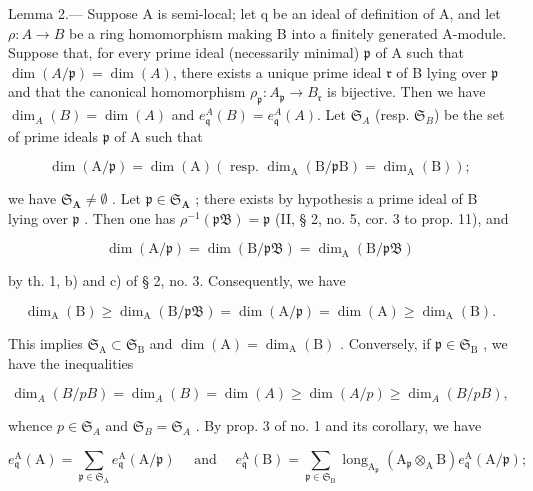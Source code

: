 Lemma 2.--- Suppose A is semi-local; let q be an ideal of definition of A, and let \(\rho : A \to B\) be a ring homomorphism making B into a finitely generated A-module. Suppose that, for every prime ideal (necessarily minimal) \(\mathfrak{p}\) of A such that \(\dim(A/\mathfrak{p}) = \dim(A)\), there exists a unique prime ideal \(\mathfrak{r}\) of B lying over \(\mathfrak{p}\) and that the canonical homomorphism \(\rho_{\mathfrak{p}} : A_{\mathfrak{p}} \to B_{\mathfrak{r}}\) is bijective. Then we have \(\dim_{A}(B) = \dim(A)\) and \(e_{\mathfrak{q}}^{A}(B) = e_{\mathfrak{q}}^{A}(A)\). Let \(\mathfrak{S}_{A}\) (resp. \(\mathfrak{S}_{B}\)) be the set of prime ideals \(\mathfrak{p}\) of A such that

\[
\dim (\mathrm{A} / \mathfrak {p}) = \dim (\mathrm{A}) (\text { resp. } \dim_ {\mathrm{A}} (\mathrm{B} / \mathfrak {p} \mathrm{B}) = \dim_ {\mathrm{A}} (\mathrm{B}));
\]

we have \(\mathfrak{S}_{\mathbf{A}} \neq \emptyset\) . Let \(\mathfrak{p} \in \mathfrak{S}_{\mathbf{A}}\) ; there exists by hypothesis a prime ideal of B lying over \(\mathfrak{p}\) . Then one has \(\rho^{-1}(\mathfrak{pB}) = \mathfrak{p}\) (II, § 2, no. 5, cor. 3 to prop. 11), and

\[
\dim (\mathrm{A} / \mathfrak {p}) = \dim (\mathrm{B} / \mathfrak {p B}) = \dim_ {\mathrm{A}} (\mathrm{B} / \mathfrak {p B})
\]

by th. 1, b) and c) of § 2, no. 3. Consequently, we have

\[
\dim_ {\mathrm{A}} (\mathrm{B}) \geqslant \dim_ {\mathrm{A}} (\mathrm{B} / \mathfrak {p B}) = \dim (\mathrm{A} / \mathfrak {p}) = \dim (\mathrm{A}) \geqslant \dim_ {\mathrm{A}} (\mathrm{B}).
\]

This implies \(\mathfrak{S}_{\mathrm{A}} \subset \mathfrak{S}_{\mathrm{B}}\) and \(\dim(\mathrm{A}) = \dim_{\mathrm{A}}(\mathrm{B})\) . Conversely, if \(\mathfrak{p} \in \mathfrak{S}_{\mathrm{B}}\) , we have the inequalities

\[
\dim_ {A} (B / p B) = \dim_ {A} (B) = \dim (A) \geqslant \dim (A / p) \geqslant \dim_ {A} (B / p B),
\]

whence \(p \in \mathfrak{S}_A\) and \(\mathfrak{S}_B = \mathfrak{S}_A\) . By prop. 3 of no. 1 and its corollary, we have

\[
e _ {\mathfrak {q}} ^ {\mathrm{A}} (\mathrm{A}) = \sum_ {\mathfrak {p} \in \mathfrak {S} _ {\mathrm{A}}} e _ {\mathfrak {q}} ^ {\mathrm{A}} (\mathrm{A} / \mathfrak {p}) \quad \text { and } \quad e _ {\mathfrak {q}} ^ {\mathrm{A}} (\mathrm{B}) = \sum_ {\mathfrak {p} \in \mathfrak {S} _ {\mathrm{B}}} \operatorname{long} _ {\mathrm{A} _ {\mathfrak {p}}} (\mathrm{A} _ {\mathfrak {p}} \otimes_ {\mathrm{A}} \mathrm{B}) e _ {\mathfrak {q}} ^ {\mathrm{A}} (\mathrm{A} / \mathfrak {p});
\]


